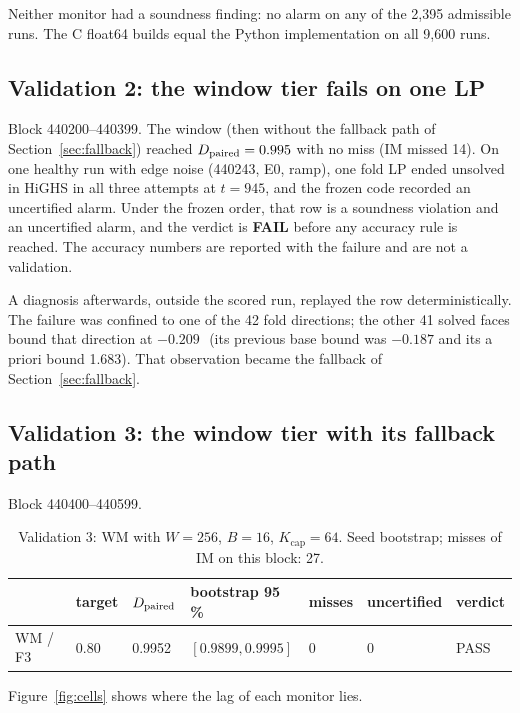 Neither monitor had a soundness finding: no alarm on any of the 2,395 admissible runs. The C float64 builds equal the
Python implementation on all 9,600 runs.

\subsection{Validation 2: the window tier fails on one LP}\label{sec:val2}

Block 440200--440399. The window (then without the fallback path of Section~\ref{sec:fallback}) reached $D_{\mathrm{paired}} = 0.995$
with no miss (IM missed 14). On one healthy run with edge noise (440243, E0, ramp), one fold LP ended unsolved in HiGHS
in all three attempts at $t = 945$, and the frozen code recorded an uncertified alarm. Under the frozen order, that row
is a soundness violation and an uncertified alarm, and the verdict is \textbf{FAIL} before any accuracy rule is
reached. The accuracy numbers are reported with the failure and are not a validation.

A diagnosis afterwards, outside the scored run, replayed the row deterministically. The failure was confined to one of
the 42 fold directions; the other 41 solved faces bound that direction at $-0.209$\,\degC\ (its previous base bound
was $-0.187$ and its a priori bound 1.683). That observation became the fallback of Section~\ref{sec:fallback}.

\subsection{Validation 3: the window tier with its fallback path}\label{sec:val3}

Block 440400--440599.

\begin{table}[t]
\centering\small
\caption{Validation 3: WM with $W = 256$, $B = 16$, $K_{\mathrm{cap}} = 64$. Seed bootstrap; misses of IM on this
block: 27.}\label{tab:val3}
\begin{tabular}{lllllll}
\toprule
 & target & $D_{\mathrm{paired}}$ & bootstrap 95\,\% & misses & uncertified & verdict\\
\midrule
WM / F3 & 0.80 & 0.9952 & $[0.9899, 0.9995]$ & 0 & 0 & PASS\\
\bottomrule
\end{tabular}
\end{table}

Figure~\ref{fig:cells} shows where the lag of each monitor lies.

